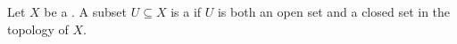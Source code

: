 \begin{definition} \label{definition:clopen_subset_of_a_topological_space}
Let $X$ be a .
A subset $U \subseteq X$ is a  if $U$ is both an open set and a closed set in the topology of $X$.
\end{definition}